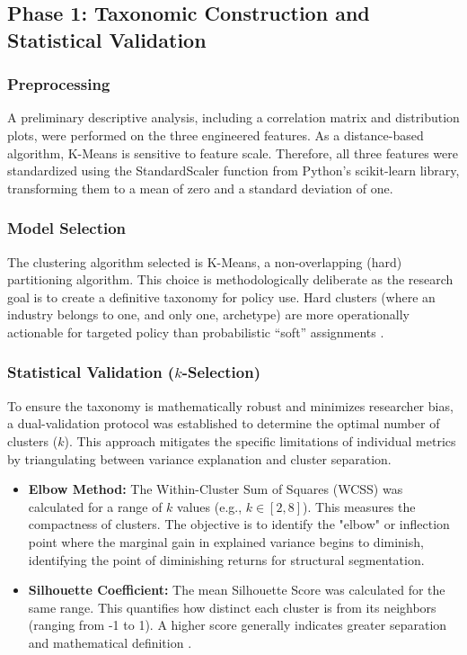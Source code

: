 \documentclass[acmtog, nonacm]{acmart}
\begin{document}
\subsection{Phase 1: Taxonomic Construction and Statistical Validation}

\subsubsection{Preprocessing}
A preliminary descriptive analysis, including a correlation matrix and distribution plots, were performed on the three engineered features. As a distance-based algorithm, K-Means is sensitive to feature scale. Therefore, all three features were standardized using the StandardScaler function from Python's scikit-learn library, transforming them to a mean of zero and a standard deviation of one.

\subsubsection{Model Selection}
The clustering algorithm selected is K-Means, a non-overlapping (hard) partitioning algorithm. This choice is methodologically deliberate as the research goal is to create a definitive taxonomy for policy use. Hard clusters (where an industry belongs to one, and only one, archetype) are more operationally actionable for targeted policy than probabilistic ``soft'' assignments \citep{nava2021}.

\subsubsection{Statistical Validation (\texorpdfstring{$k$}{k}-Selection)}
To ensure the taxonomy is mathematically robust and minimizes researcher bias, a dual-validation protocol was established to determine the optimal number of clusters ($k$). This approach mitigates the specific limitations of individual metrics by triangulating between variance explanation and cluster separation.

\begin{itemize}
    \item \textbf{Elbow Method:} The Within-Cluster Sum of Squares (WCSS) was calculated for a range of $k$ values (e.g., $k \in [2, 8]$). This measures the compactness of clusters. The objective is to identify the "elbow" or inflection point where the marginal gain in explained variance begins to diminish, identifying the point of diminishing returns for structural segmentation.
    \item \textbf{Silhouette Coefficient:} The mean Silhouette Score was calculated for the same range. This quantifies how distinct each cluster is from its neighbors (ranging from -1 to 1). A higher score generally indicates greater separation and mathematical definition .
\end{itemize}
\end{document}
